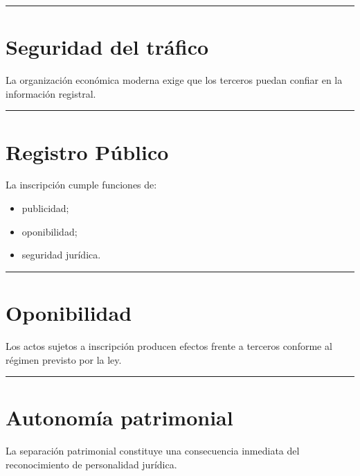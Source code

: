 \documentclass[
  spanish,
  letterpaper,
  DIV=11,
  numbers=noendperiod]{scrartcl}
\providecommand{\tightlist}{%
  \setlength{\itemsep}{0pt}\setlength{\parskip}{0pt}}
\begin{document}
\begin{center}\rule{0.5\linewidth}{0.5pt}\end{center}

\section{Seguridad del tráfico}\label{seguridad-del-truxe1fico}

La organización económica moderna exige que los terceros puedan confiar
en la información registral.

\begin{center}\rule{0.5\linewidth}{0.5pt}\end{center}

\section{Registro Público}\label{registro-puxfablico-1}

La inscripción cumple funciones de:

\begin{itemize}
\tightlist
\item
  publicidad;
\item
  oponibilidad;
\item
  seguridad jurídica.
\end{itemize}

\begin{center}\rule{0.5\linewidth}{0.5pt}\end{center}

\section{Oponibilidad}\label{oponibilidad}

Los actos sujetos a inscripción producen efectos frente a terceros
conforme al régimen previsto por la ley.

\begin{center}\rule{0.5\linewidth}{0.5pt}\end{center}

\section{Autonomía patrimonial}\label{autonomuxeda-patrimonial-1}

La separación patrimonial constituye una consecuencia inmediata del
reconocimiento de personalidad jurídica.
\end{document}
